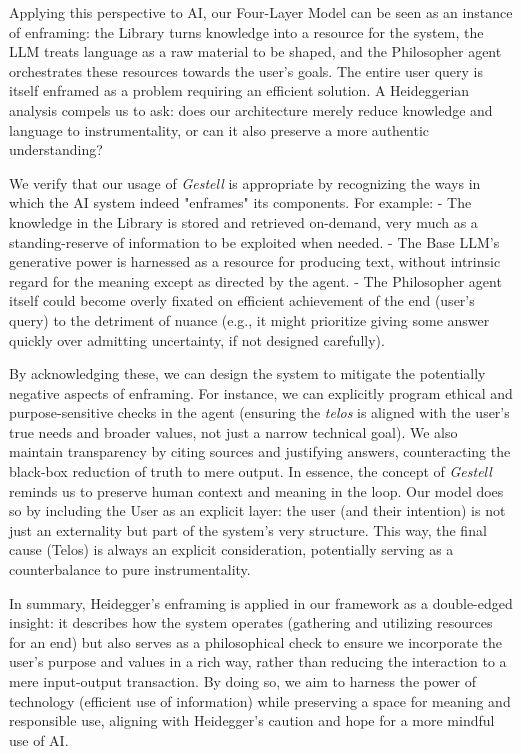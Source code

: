 \documentclass{article}
\begin{document}
Applying this perspective to AI, our Four-Layer Model can be seen as an instance of enframing: the Library turns knowledge into a resource for the system, the LLM treats language as a raw material to be shaped, and the Philosopher agent orchestrates these resources towards the user's goals. The entire user query is itself enframed as a problem requiring an efficient solution. A Heideggerian analysis compels us to ask: does our architecture merely reduce knowledge and language to instrumentality, or can it also preserve a more authentic understanding?

We verify that our usage of \emph{Gestell} is appropriate by recognizing the ways in which the AI system indeed "enframes" its components. For example:
- The knowledge in the Library is stored and retrieved on-demand, very much as a standing-reserve of information to be exploited when needed.
- The Base LLM's generative power is harnessed as a resource for producing text, without intrinsic regard for the meaning except as directed by the agent.
- The Philosopher agent itself could become overly fixated on efficient achievement of the end (user's query) to the detriment of nuance (e.g., it might prioritize giving some answer quickly over admitting uncertainty, if not designed carefully).

By acknowledging these, we can design the system to mitigate the potentially negative aspects of enframing. For instance, we can explicitly program ethical and purpose-sensitive checks in the agent (ensuring the \emph{telos} is aligned with the user's true needs and broader values, not just a narrow technical goal). We also maintain transparency by citing sources and justifying answers, counteracting the black-box reduction of truth to mere output. In essence, the concept of \emph{Gestell} reminds us to preserve human context and meaning in the loop. Our model does so by including the User as an explicit layer: the user (and their intention) is not just an externality but part of the system's very structure. This way, the final cause (Telos) is always an explicit consideration, potentially serving as a counterbalance to pure instrumentality. 

In summary, Heidegger's enframing is applied in our framework as a double-edged insight: it describes how the system operates (gathering and utilizing resources for an end) but also serves as a philosophical check to ensure we incorporate the user's purpose and values in a rich way, rather than reducing the interaction to a mere input-output transaction. By doing so, we aim to harness the power of technology (efficient use of information) while preserving a space for meaning and responsible use, aligning with Heidegger's caution and hope for a more mindful use of AI.
\end{document}
